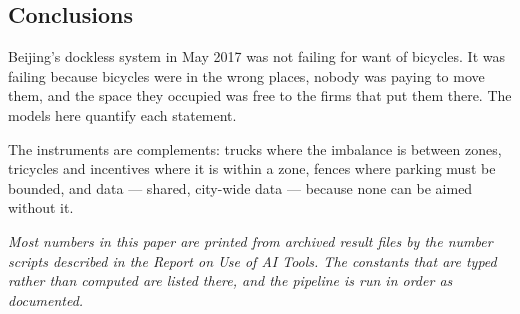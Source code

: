 \subsection{Conclusions}

Beijing's dockless system in May 2017 was not failing for want of bicycles. It
was failing because bicycles were in the wrong places, nobody was paying to
move them, and the space they occupied was free to the firms that put them
there. The models here quantify each statement.

The instruments are complements: trucks where the imbalance is
between zones, tricycles and incentives where it is within a zone, fences where parking
must be bounded, and data --- shared, city-wide data --- because none can be aimed
without it.

\emph{Most numbers in this paper are printed from archived result files by the
number scripts described in the Report on Use of AI Tools. The constants that are
typed rather than computed are listed there, and the pipeline is run in order as
documented.}
